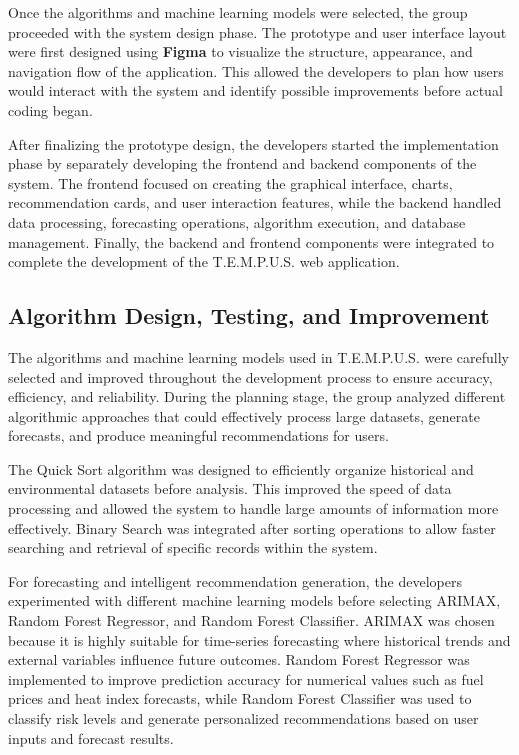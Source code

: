 \documentclass[12pt]{article}
\begin{document}
Once the algorithms and machine learning models were selected, the group proceeded with the system design phase. The prototype and user interface layout were first designed using \textbf{Figma} to visualize the structure, appearance, and navigation flow of the application. This allowed the developers to plan how users would interact with the system and identify possible improvements before actual coding began.

After finalizing the prototype design, the developers started the implementation phase by separately developing the frontend and backend components of the system. The frontend focused on creating the graphical interface, charts, recommendation cards, and user interaction features, while the backend handled data processing, forecasting operations, algorithm execution, and database management. Finally, the backend and frontend components were integrated to complete the development of the T.E.M.P.U.S. web application.

\subsection{Algorithm Design, Testing, and Improvement}

The algorithms and machine learning models used in T.E.M.P.U.S. were carefully selected and improved throughout the development process to ensure accuracy, efficiency, and reliability. During the planning stage, the group analyzed different algorithmic approaches that could effectively process large datasets, generate forecasts, and produce meaningful recommendations for users.

The Quick Sort algorithm was designed to efficiently organize historical and environmental datasets before analysis. This improved the speed of data processing and allowed the system to handle large amounts of information more effectively. Binary Search was integrated after sorting operations to allow faster searching and retrieval of specific records within the system.

For forecasting and intelligent recommendation generation, the developers experimented with different machine learning models before selecting ARIMAX, Random Forest Regressor, and Random Forest Classifier. ARIMAX was chosen because it is highly suitable for time-series forecasting where historical trends and external variables influence future outcomes. Random Forest Regressor was implemented to improve prediction accuracy for numerical values such as fuel prices and heat index forecasts, while Random Forest Classifier was used to classify risk levels and generate personalized recommendations based on user inputs and forecast results.
\end{document}
